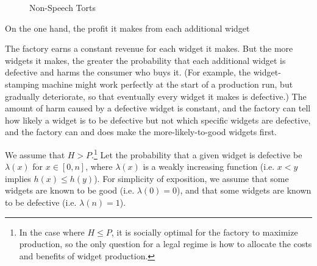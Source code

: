 \begin{figure}[ht]
	\centering
{}
	\caption{Non-Speech Torts}
	\label{fig:nonspeech}
\end{figure}

On the one hand, the profit it makes from each additional widget 

The factory earns a constant revenue for each widget it makes. But the more widgets it makes, the greater the probability that each additional widget is defective and harms the consumer who buys it. (For example, the widget-stamping machine might work perfectly at the start of a production run, but gradually deteriorate, so that eventually every widget it makes is defective.) The amount of harm caused by a defective widget is constant, and the factory can tell how likely a widget is to be defective but not which specific widgets are defective, and the factory can and does make the more-likely-to-good widgets first.


We assume that $H > P$.\footnote{In the case where $H \le P$, it is socially optimal for the factory to maximize production, so the only question for a legal regime is how to allocate the costs and benefits of widget production.} Let the probability that a given widget is defective be $\lambda(x)$ for $x \in [0,n]$, where $\lambda(x)$ is a weakly increasing function (i.e. $x < y$ implies $h(x) \le h(y)$). For simplicity of exposition, we assume that some widgets are known to be good (i.e. $\lambda(0) = 0$), and that some widgets are known to be defective (i.e. $\lambda(n) = 1$). 

